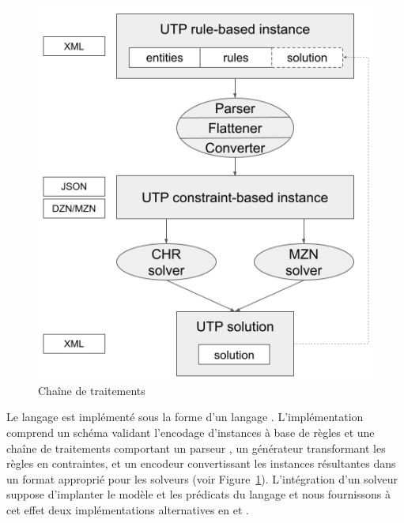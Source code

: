\begin{figure}[!t]
\begin{center}
\includegraphics[scale=0.4]{2022_JFPC/img/utp_toolchain.png}
\end{center}
\caption{Chaîne de traitements {\UTP}}%
\label{fig:utp-toolchain}
\end{figure}

Le langage {\UTP} est implémenté sous la forme d'un langage {\XML}.
L'implémentation comprend un schéma {\XML} validant l'encodage d'instances %
à base de règles et une chaîne de traitements comportant
un parseur {\XML},
un générateur transformant les règles en contraintes, 
et un encodeur convertissant les instances résultantes
dans un format approprié pour les solveurs (voir Figure~\ref{fig:utp-toolchain}).
L'intégration d'un solveur suppose d'implanter le modèle et les prédicats du langage {\UTP} et nous fournissons à cet effet deux implémentations alternatives en {\MINIZINC} \cite{MZN} et {\CHR} \cite{Fruhwirth_CP_94}.

